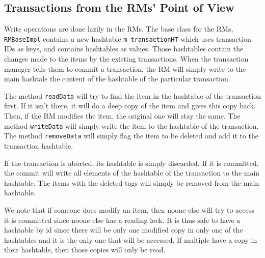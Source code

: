 \documentclass[12pt]{article}
\theoremstyle{plain}%
\theoremstyle{definition}
\theoremstyle{remark}
\newcommand{\java}[1]{{\lstinline!#1!}}
\begin{document}
\subsection*{Transactions from the RMs' Point of View}

Write operations are done lazily in the RMs. The base class for the RMs, \java{RMBaseImpl} contains a new hashtable \java{m_transactionHT} which uses transaction IDs as keys, and contains hashtables as values. Those hashtables contain the changes made to the items by the existing transactions. When the transaction manager tells them to commit a transaction, the RM will simply write to the main hashtale the content of the hashtable of the particular transaction.

The method \java{readData} will try to find the item in the hashtable of the transaction first. If it isn't there, it will do a deep copy of the item and gives this copy back. Then, if the RM modifies the item, the original one will stay the same. The method \java{writeData} will simply write the item to the hashtable of the transaction. The method \java{removeData} will simply flag the item to be deleted and add it to the transaction hashtable.

If the transaction is aborted, its hashtable is simply discarded. If it is committed, the commit will write all elements of the hashtable of the transaction to the main hashtable. The items with the deleted tags will simply be removed from the main hashtable.

We note that if someone does modify an item, then noone else will try to access it is committed since noone else has a reading lock. It is thus safe to have a hashtable by id since there will be only one modified copy in only one of the hashtables and it is the only one that will be accessed. If multiple have a copy in their hashtable, then those copies will only be read.
\end{document}
